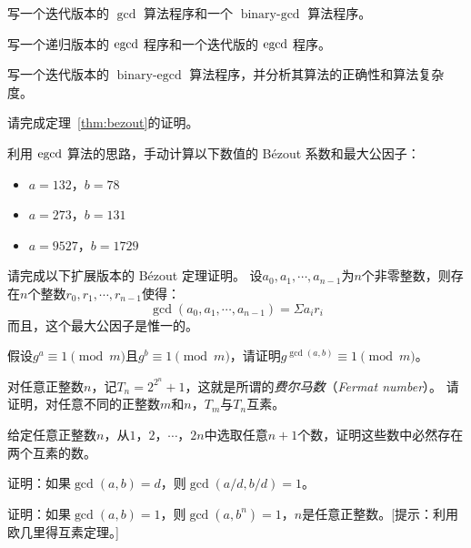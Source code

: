 \begin{problemset}
  
  \item 写一个迭代版本的 $\gcd$ 算法程序和一个 $\operatorname{binary-gcd}$ 算法程序。
  
  \item 写一个递归版本的 $\operatorname{egcd}$ 程序和一个迭代版的 $\operatorname{egcd}$ 程序。
  
  \item 写一个迭代版本的 $\operatorname{binary-egcd}$ 算法程序，并分析其算法的正确性和算法复杂度。
  
  \item 请完成定理~\ref{thm:bezout}的证明。
  
  \item 利用 $\operatorname{egcd}$ 算法的思路，手动计算以下数值的 B\'{e}zout 系数和最大公因子：
  \begin{itemize}
  \item $a = 132$，$b = 78$  %
  \item $a = 273$，$b = 131$ %
  \item $a = 9527$，$b = 1729$ %
  \end{itemize}
  
  \item 请完成以下扩展版本的 B\'{e}zout 定理证明。
  	设$a_0, a_1, \cdots , a_{n-1}$为$n$个非零整数，则存在$n$个整数$r_0, r_1, \cdots, r_{n-1}$使得：
  	\[\gcd(a_0, a_1, \cdots, a_{n-1}) =\Sigma a_i r_i \]
  	而且，这个最大公因子是惟一的。
  
 \item 假设$g^a \equiv 1 \pmod{m}$且$g^b \equiv 1 \pmod{m}$，请证明$g^{\gcd(a,b)} \equiv 1 \pmod{m}$。%
 
  \item 对任意正整数$n$，记$T_n = 2^{2^n} + 1$，这就是所谓的\emph{费尔马数}（\emph{Fermat number}）。
  请证明，对任意不同的正整数$m$和$n$，$T_m$与$T_n$互素。
  
 \item 给定任意正整数$n$，从$1$，$2$，$\cdots$，$2n$中选取任意$n+1$个数，证明这些数中必然存在两个互素的数。%
 
  \item 证明：如果$\gcd(a,b) =d$，则$\gcd(a/d, b/d) =1$。
   
   \item 证明：如果$\gcd(a,b) =1$，则$\gcd(a, b^n) =1$，$n$是任意正整数。[提示：利用欧几里得互素定理。]
   

\end{problemset}
